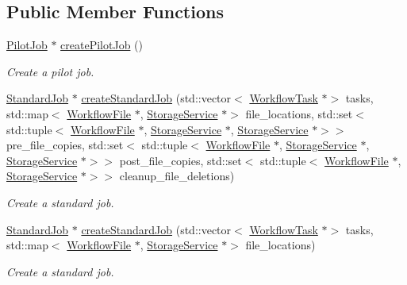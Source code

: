 \subsection*{Public Member Functions}
\begin{DoxyCompactItemize}
\item 
\hyperlink{classwrench_1_1_pilot_job}{Pilot\+Job} $\ast$ \hyperlink{classwrench_1_1_job_manager_a9ef786306730359866e3fd2bd3aadaf7}{create\+Pilot\+Job} ()
\begin{DoxyCompactList}\small\item\em Create a pilot job. \end{DoxyCompactList}\item 
\hyperlink{classwrench_1_1_standard_job}{Standard\+Job} $\ast$ \hyperlink{classwrench_1_1_job_manager_a7f3873e56c8813c90b66683690d6b328}{create\+Standard\+Job} (std\+::vector$<$ \hyperlink{classwrench_1_1_workflow_task}{Workflow\+Task} $\ast$$>$ tasks, std\+::map$<$ \hyperlink{classwrench_1_1_workflow_file}{Workflow\+File} $\ast$, \hyperlink{classwrench_1_1_storage_service}{Storage\+Service} $\ast$$>$ file\+\_\+locations, std\+::set$<$ std\+::tuple$<$ \hyperlink{classwrench_1_1_workflow_file}{Workflow\+File} $\ast$, \hyperlink{classwrench_1_1_storage_service}{Storage\+Service} $\ast$, \hyperlink{classwrench_1_1_storage_service}{Storage\+Service} $\ast$$>$$>$ pre\+\_\+file\+\_\+copies, std\+::set$<$ std\+::tuple$<$ \hyperlink{classwrench_1_1_workflow_file}{Workflow\+File} $\ast$, \hyperlink{classwrench_1_1_storage_service}{Storage\+Service} $\ast$, \hyperlink{classwrench_1_1_storage_service}{Storage\+Service} $\ast$$>$$>$ post\+\_\+file\+\_\+copies, std\+::set$<$ std\+::tuple$<$ \hyperlink{classwrench_1_1_workflow_file}{Workflow\+File} $\ast$, \hyperlink{classwrench_1_1_storage_service}{Storage\+Service} $\ast$$>$$>$ cleanup\+\_\+file\+\_\+deletions)
\begin{DoxyCompactList}\small\item\em Create a standard job. \end{DoxyCompactList}\item 
\hyperlink{classwrench_1_1_standard_job}{Standard\+Job} $\ast$ \hyperlink{classwrench_1_1_job_manager_a1dc600a984151ddff2fe5d20525b33bc}{create\+Standard\+Job} (std\+::vector$<$ \hyperlink{classwrench_1_1_workflow_task}{Workflow\+Task} $\ast$$>$ tasks, std\+::map$<$ \hyperlink{classwrench_1_1_workflow_file}{Workflow\+File} $\ast$, \hyperlink{classwrench_1_1_storage_service}{Storage\+Service} $\ast$$>$ file\+\_\+locations)
\begin{DoxyCompactList}\small\item\em Create a standard job. \end{DoxyCompactList}\item 

\end{DoxyCompactItemize}
